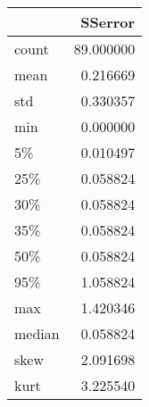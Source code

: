 \begin{tabular}{lr}
\toprule
{} &    SSerror \\
\midrule
count  &  89.000000 \\
mean   &   0.216669 \\
std    &   0.330357 \\
min    &   0.000000 \\
5\%     &   0.010497 \\
25\%    &   0.058824 \\
30\%    &   0.058824 \\
35\%    &   0.058824 \\
50\%    &   0.058824 \\
95\%    &   1.058824 \\
max    &   1.420346 \\
median &   0.058824 \\
skew   &   2.091698 \\
kurt   &   3.225540 \\
\bottomrule
\end{tabular}
